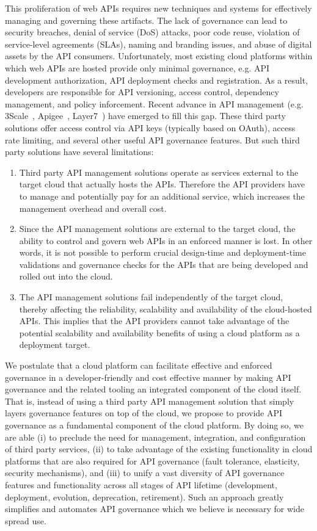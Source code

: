 This proliferation of web APIs requires new techniques and systems for 
effectively managing and governing these artifacts.
The lack of governance can lead to 
security breaches, denial of service (DoS)
attacks, poor code reuse, violation of service-level agreements (SLAs), 
naming and branding issues, and abuse of digital 
assets by the API consumers. Unfortunately, most existing cloud platforms
within which web APIs are hosted provide only minimal governance, e.g.
API development authorization, API deployment checks and registration.
As a result, developers are responsible for API versioning, access control,
dependency management, and policy inforcement. Recent advance in 
API management (e.g. 3Scale~\cite{3scale}, Apigee~\cite{apigee},
Layer7~\cite{layer7}) have emerged to fill this gap. 
These third party solutions offer access control
via API keys (typically based on OAuth), access rate limiting, and 
several other useful API governance features. But such third party 
solutions have several limitations:
\begin{enumerate}
\item Third party API management solutions operate as services external to the target cloud that actually hosts the APIs. Therefore 
the API providers have to manage and potentially pay for an additional service, which increases the management overhead and overall cost.
\item Since the API management solutions are external to the target cloud, the ability to control and govern web APIs in an enforced manner is
lost. In other words, it is not possible to perform crucial design-time and deployment-time validations and governance checks for the APIs
that are being developed and rolled out into the cloud. 
\item The API management solutions fail independently of the target cloud, thereby affecting the reliability, scalability and availability of the 
cloud-hosted APIs. This implies that the API providers cannot take advantage of the potential scalability and availability benefits of using a cloud
platform as a deployment target.
\end{enumerate}

We postulate that a cloud platform can facilitate effective and 
enforced governance in a developer-friendly and cost effective manner by
making API governance and the related tooling an integrated component of the cloud itself. 
That is, instead of using a third party API management
solution that simply layers governance features on top of the cloud, 
we propose to provide API governance as a fundamental component of the cloud
platform.  By doing so, we are able (i) to preclude the need for management,
integration, and configuration of third party services, (ii) to take advantage
of the existing functionality in cloud platforms that are also required for 
API governance (fault tolerance, elasticity, security mechanisms), and (iii)
to unify a vast diversity of API
governance features and functionality across all stages of API lifetime
(development, deployment, evolution, deprecation, retirement). Such an
approach greatly simplifies and automates API governance which we believe
is necessary for wide spread use.

